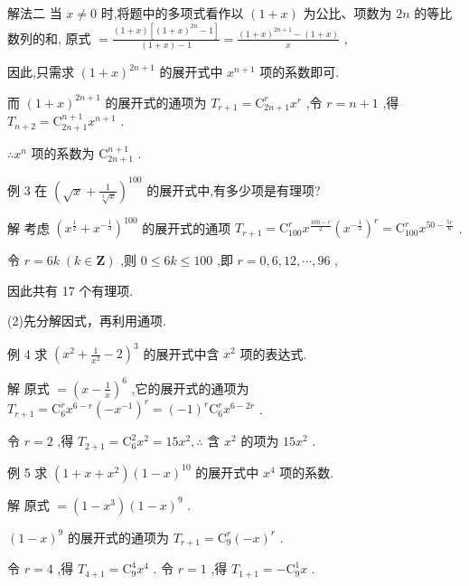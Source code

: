 \documentclass[10pt]{article}
\begin{document}
解法二 当 \(x \neq  0\) 时,将题中的多项式看作以 \(\left( {1 + x}\right)\) 为公比、项数为 \({2n}\) 的等比数列的和, 原式 \(= \frac{\left( {1 + x}\right) \left\lbrack  {{\left( 1 + x\right) }^{2n} - 1}\right\rbrack  }{\left( {1 + x}\right)  - 1} = \frac{{\left( 1 + x\right) }^{{2n} + 1} - \left( {1 + x}\right) }{x}\) ,

因此,只需求 \({\left( 1 + x\right) }^{{2n} + 1}\) 的展开式中 \({x}^{n + 1}\) 项的系数即可.

而 \({\left( 1 + x\right) }^{{2n} + 1}\) 的展开式的通项为 \({T}_{r + 1} = {\mathrm{C}}_{{2n} + 1}^{r}{x}^{r}\) ,令 \(r = n + 1\) ,得 \({T}_{n + 2} = {\mathrm{C}}_{{2n} + 1}^{n + 1}{x}^{n + 1}\) .

\(\therefore {x}^{n}\) 项的系数为 \({\mathrm{C}}_{{2n} + 1}^{n + 1}\) .

例 3 在 \({\left( \sqrt{x} + \frac{1}{\sqrt[3]{x}}\right) }^{100}\) 的展开式中,有多少项是有理项?

解 考虑 \({\left( {x}^{\frac{1}{2}} + {x}^{-\frac{1}{3}}\right) }^{100}\) 的展开式的通项 \({T}_{r + 1} = {\mathrm{C}}_{100}^{r}{x}^{\frac{{100} - r}{2}}{\left( {x}^{-\frac{1}{3}}\right) }^{r} = {\mathrm{C}}_{100}^{r}{x}^{{50} - \frac{5r}{6}}\) .

令 \(r = {6k}\;\left( {k \in  \mathbf{Z}}\right)\) ,则 \(0 \leq  {6k} \leq  {100}\) ,即 \(r = 0,6,{12},\cdots ,{96}\) ,

因此共有 17 个有理项.

(2)先分解因式，再利用通项.

例 4 求 \({\left( {x}^{2} + \frac{1}{{x}^{2}} - 2\right) }^{3}\) 的展开式中含 \({x}^{2}\) 项的表达式.

解 原式 \(= {\left( x - \frac{1}{x}\right) }^{6}\) ,它的展开式的通项为 \({T}_{r + 1} = {\mathrm{C}}_{6}^{r}{x}^{6 - r}{\left( -{x}^{-1}\right) }^{r} = {\left( -1\right) }^{r}{\mathrm{C}}_{6}^{r}{x}^{6 - {2r}}\) .

令 \(r = 2\) ,得 \({T}_{2 + 1} = {\mathrm{C}}_{6}^{2}{x}^{2} = {15}{x}^{2},\therefore\) 含 \({x}^{2}\) 的项为 \({15}{x}^{2}\) .

例 5 求 \(\left( {1 + x + {x}^{2}}\right) {\left( 1 - x\right) }^{10}\) 的展开式中 \({x}^{4}\) 项的系数.

解 原式 \(= \left( {1 - {x}^{3}}\right) {\left( 1 - x\right) }^{9}\) .

\({\left( 1 - x\right) }^{9}\) 的展开式的通项为 \({T}_{r + 1} = {\mathrm{C}}_{9}^{r}{\left( -x\right) }^{r}\) .

令 \(r = 4\) ,得 \({T}_{4 + 1} = {\mathrm{C}}_{9}^{4}{x}^{4}\) . 令 \(r = 1\) ,得 \({T}_{1 + 1} =  - {\mathrm{C}}_{9}^{1}x\) .
\end{document}
